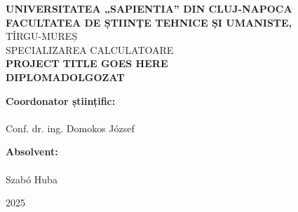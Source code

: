 \begin{titlepage}
    \centering
    \vspace*{2cm}

    {\Large \textbf{UNIVERSITATEA „SAPIENTIA” DIN CLUJ-NAPOCA}}\\[0.2cm]
    {\Large \textbf{FACULTATEA DE ȘTIINȚE TEHNICE ȘI UMANISTE,}}\\[0.5cm]
    {\large TÎRGU-MUREȘ}\\[0.2cm]
    {\large  SPECIALIZAREA CALCULATOARE}\\[3cm]

    {\LARGE \textbf{PROJECT TITLE GOES HERE}}\\[0.5cm] 
    {\Large \textbf{DIPLOMADOLGOZAT}}\\[4cm]

    \begin{flushleft}
        \begin{minipage}{0.45\textwidth}
            \textbf{Coordonator științific:}\\
            \\
            Conf. dr. ing. Domokos József\\
        \end{minipage}
        \hfill
    \begin{minipage}{0.45\textwidth}
            \textbf{Absolvent: }\\
            \\
            Szabó Huba
        \end{minipage}
    \end{flushleft}

    \vfill

    {\large  2025}

\end{titlepage}
